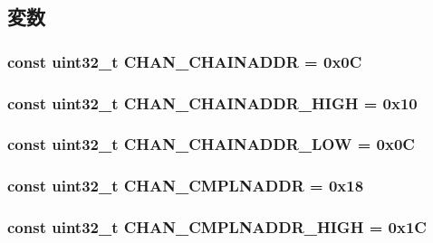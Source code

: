 \subsection{変数}
\hypertarget{namespaceCopyEngineReg_a5a66b3472d97177e315251d5167d3bf0}{
\subsubsection[{CHAN\_\-CHAINADDR}]{\setlength{\rightskip}{0pt plus 5cm}const {\bf uint32\_\-t} {\bf CHAN\_\-CHAINADDR} = 0x0C}}
\label{namespaceCopyEngineReg_a5a66b3472d97177e315251d5167d3bf0}
\hypertarget{namespaceCopyEngineReg_a2accc1f83257729ca7e6509ca4912063}{
\subsubsection[{CHAN\_\-CHAINADDR\_\-HIGH}]{\setlength{\rightskip}{0pt plus 5cm}const {\bf uint32\_\-t} {\bf CHAN\_\-CHAINADDR\_\-HIGH} = 0x10}}
\label{namespaceCopyEngineReg_a2accc1f83257729ca7e6509ca4912063}
\hypertarget{namespaceCopyEngineReg_a274d905bf3d7e52cd2c1488a6215c11f}{
\subsubsection[{CHAN\_\-CHAINADDR\_\-LOW}]{\setlength{\rightskip}{0pt plus 5cm}const {\bf uint32\_\-t} {\bf CHAN\_\-CHAINADDR\_\-LOW} = 0x0C}}
\label{namespaceCopyEngineReg_a274d905bf3d7e52cd2c1488a6215c11f}
\hypertarget{namespaceCopyEngineReg_a105aff5782e20230e52fff690e6cdb99}{
\subsubsection[{CHAN\_\-CMPLNADDR}]{\setlength{\rightskip}{0pt plus 5cm}const {\bf uint32\_\-t} {\bf CHAN\_\-CMPLNADDR} = 0x18}}
\label{namespaceCopyEngineReg_a105aff5782e20230e52fff690e6cdb99}
\hypertarget{namespaceCopyEngineReg_ab4915d1760e85a49bed54729ef4fffc7}{
\subsubsection[{CHAN\_\-CMPLNADDR\_\-HIGH}]{\setlength{\rightskip}{0pt plus 5cm}const {\bf uint32\_\-t} {\bf CHAN\_\-CMPLNADDR\_\-HIGH} = 0x1C}}
